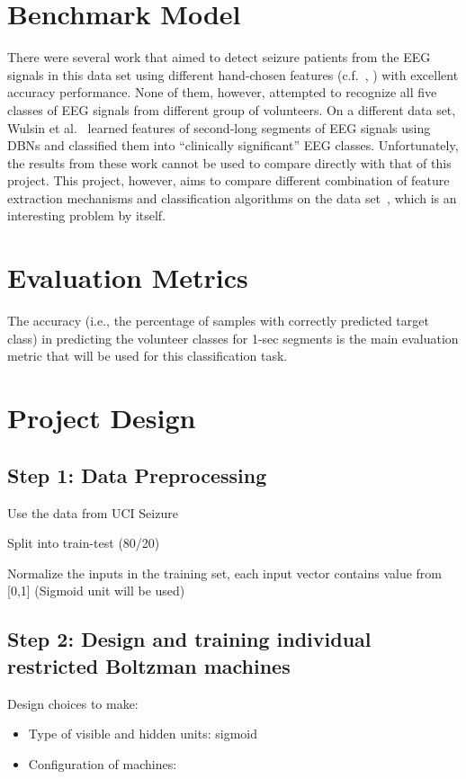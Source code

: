 \documentclass[12pt]{article}
\begin{document}
\section{Benchmark Model}

There were several work that aimed to detect seizure patients from the EEG signals in this data set using different hand-chosen features (c.f.~\cite{nigam2004neural}, \cite{kabir2016epileptic}) with excellent accuracy performance. None of them, however, attempted to recognize all five classes of EEG signals from different group of volunteers. On a different data set, Wulsin et al.~\cite{wulsin2011modeling} learned features of second-long segments of EEG signals using DBNs and classified them into ``clinically significant'' EEG classes. Unfortunately, the results from these work cannot be used to compare directly with that of this project. This project, however, aims to compare different combination of feature extraction mechanisms and classification algorithms on the data set~\cite{andrzejak2001indications}, which is an interesting problem by itself.

\section{Evaluation Metrics}

The accuracy (i.e., the percentage of samples with correctly predicted target class) in predicting the volunteer classes for 1-sec segments is the main evaluation metric that will be used for this classification task.

\section{Project Design}

\subsection{Step 1: Data Preprocessing}

Use the data from UCI Seizure~\cite{UCISeizure}

Split into train-test (80/20)

Normalize the inputs in the training set, each input vector contains value from [0,1] (Sigmoid unit will be used)

\subsection{Step 2: Design and training individual restricted Boltzman machines}

Design choices to make:
\begin{itemize}
\item Type of visible and hidden units: sigmoid
\item Configuration of machines: 
\end{itemize}



\end{document}
